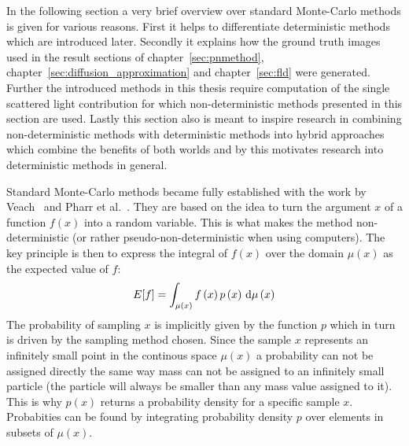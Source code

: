 In the following section a very brief overview over standard Monte-Carlo methods is given for various reasons. First it helps to differentiate deterministic methods which are introduced later. Secondly it explains how the ground truth images used in the result sections of chapter~\ref{sec:pnmethod}, chapter~\ref{sec:diffusion_approximation} and chapter~\ref{sec:fld} were generated. Further the introduced methods in this thesis require computation of the single scattered light contribution for which non-deterministic methods presented in this section are used. Lastly this section also is meant to inspire research in combining non-deterministic methods with deterministic methods into hybrid approaches which combine the benefits of both worlds and by this motivates research into deterministic methods in general.


\label{sec:pathtracing}

Standard Monte-Carlo methods became fully established with the work by Veach~\cite{VeachThesis97} and Pharr et al.~\cite{Pharr10}. They are based on the idea to turn the argument $x$ of a function $f(x)$ into a random variable. This is what makes the method non-deterministic (or rather pseudo-non-deterministic when using computers). The key principle is then to express the integral of $f(x)$ over the domain $\mu(x)$ as the expected value of $f$:
\begin{align}
E[f] = \int_{\mu\left(x\right)} f\left(x\right)p\left(x\right)\,\mathrm{d}\mu\left(x\right)
\end{align}
The probability of sampling $x$ is implicitly given by the function $p$ which in turn is driven by the sampling method chosen. Since the sample $x$ represents an infinitely small point in the continous space $\mu\left(x\right)$ a probability can not be assigned directly the same way mass can not be assigned to an infinitely small particle (the particle will always be smaller than any mass value assigned to it). This is why $p(x)$ returns a probability density for a specific sample $x$. Probabities can be found by integrating probability density $p$ over elements in subsets of $\mu\left(x\right)$.

